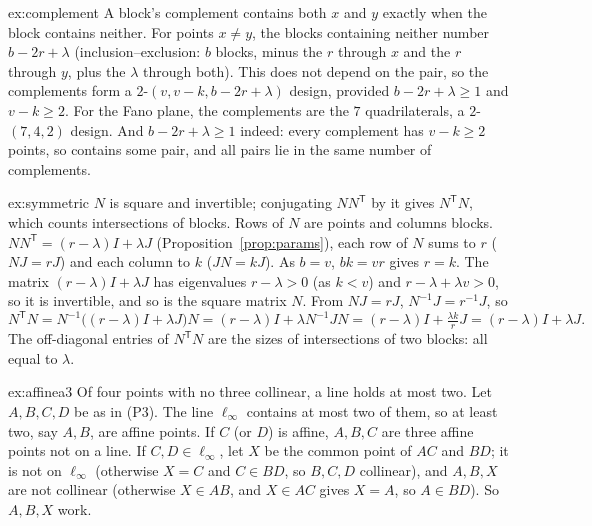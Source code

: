\begin{solution}{ex:complement}
\idea A block's complement contains both $x$ and $y$ exactly when the block contains neither.
\writeup For points $x\ne y$, the blocks containing neither number $b-2r+\lambda$ (inclusion--exclusion: $b$ blocks, minus the $r$ through $x$ and the $r$ through $y$, plus the $\lambda$ through both). This does not
depend on the pair, so the complements form a $2$-$(v,v-k,b-2r+\lambda)$ design, provided $b-2r+\lambda\ge1$ and $v-k\ge2$. For the Fano plane, the complements are the $7$ quadrilaterals, a $2$-$(7,4,2)$ design.
And $b-2r+\lambda\ge1$ indeed: every complement has $v-k\ge2$ points, so contains some pair, and all pairs lie in the same number of complements.
\end{solution}

\begin{solution}{ex:symmetric}
\idea $N$ is square and invertible; conjugating $NN^{\mathsf T}$ by it gives $N^{\mathsf T}N$, which counts intersections of blocks.
\writeup Rows of $N$ are points and columns blocks. $NN^{\mathsf T}=(r-\lambda)I+\lambda J$ (Proposition~\ref{prop:params}), each row of $N$ sums to $r$ ($NJ=rJ$) and each column to $k$ ($JN=kJ$). As $b=v$, $bk=vr$ gives
$r=k$. The matrix $(r-\lambda)I+\lambda J$ has eigenvalues $r-\lambda>0$ (as $k<v$) and $r-\lambda+\lambda v>0$, so it is invertible, and so is the square matrix $N$. From $NJ=rJ$, $N^{-1}J=r^{-1}J$, so
\[
N^{\mathsf T}N=N^{-1}\bigl((r-\lambda)I+\lambda J\bigr)N=(r-\lambda)I+\lambda N^{-1}JN=(r-\lambda)I+\tfrac{\lambda k}rJ=(r-\lambda)I+\lambda J.
\]
The off-diagonal entries of $N^{\mathsf T}N$ are the sizes of intersections of two blocks: all equal to $\lambda$.
\end{solution}

\begin{solution}{ex:affinea3}
\idea Of four points with no three collinear, a line holds at most two.
\writeup Let $A,B,C,D$ be as in (P3). The line $\ell_\infty$ contains at most two of them, so at least two, say $A,B$, are affine points. If $C$ (or $D$) is affine, $A,B,C$ are three affine points not on a line. If $C,D\in\ell_\infty$,
let $X$ be the common point of $AC$ and $BD$; it is not on $\ell_\infty$ (otherwise $X=C$ and $C\in BD$, so $B,C,D$ collinear), and $A,B,X$ are not collinear (otherwise $X\in AB$, and $X\in AC$ gives $X=A$, so
$A\in BD$). So $A,B,X$ work.
\end{solution}

